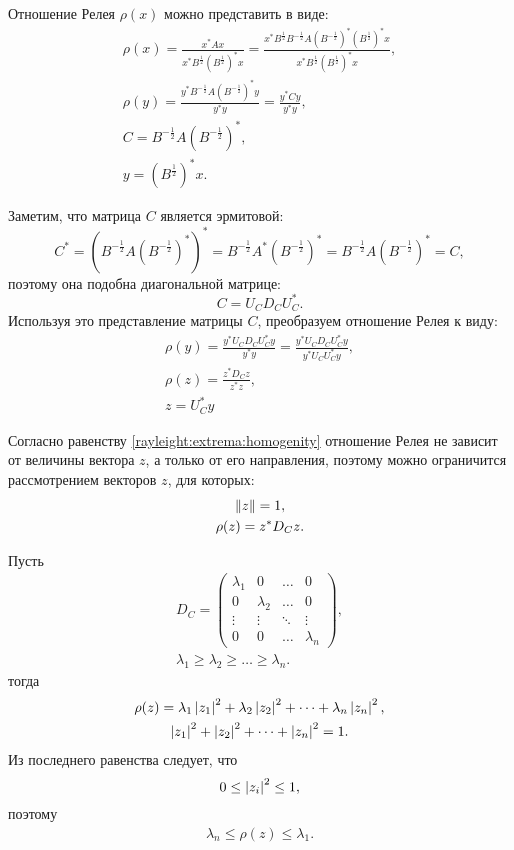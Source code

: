 Отношение Релея $\rho(x)$ можно представить в виде:
\begin{gather*}
    \rho(x)
    = \frac{x^* A x}{x^* B^\frac{1}{2} ( B^\frac{1}{2} )^* x}
    = \frac{x^* B^\frac{1}{2} B^{-\frac{1}{2}} A ( B^{-\frac{1}{2}} )^* ( B^\frac{1}{2} )^* x}{x^* B^\frac{1}{2} ( B^\frac{1}{2} )^* x} , \\
    \rho(y)
    = \frac{y^* B^{-\frac{1}{2}} A ( B^{-\frac{1}{2}} )^* y}{y^* y}
    = \frac{y^* C y}{y^* y}, \\
    C = B^{-\frac{1}{2}} A ( B^{-\frac{1}{2}} )^*, \\
    y = ( B^\frac{1}{2} )^* x .
\end{gather*}

Заметим, что матрица $C$ является эрмитовой:
\[
    C^*
    = ( B^{-\frac{1}{2}} A ( B^{-\frac{1}{2}} )^* )^*
    = B^{-\frac{1}{2}} A^* ( B^{-\frac{1}{2}} )^*
    = B^{-\frac{1}{2}} A ( B^{-\frac{1}{2}} )^*
    = C,
\]
поэтому она подобна диагональной матрице:
\[
    C = U_C D_C U_C^* .
\]
Используя это представление матрицы $C$, преобразуем отношение Релея к виду:
\begin{gather*}
    \rho(y)
    = \frac{y^* U_C D_C U_C^* y}{y^* y}
    = \frac{y^* U_C D_C U_C^* y}{y^* U_C U_C^* y} , \\
    \rho(z)
    = \frac{z^* D_C z}{z^* z} , \\
    z = U_C^* y
\end{gather*}

Согласно равенству \eqref{rayleight:extrema:homogenity} отношение Релея не зависит от величины вектора $z$, а только от его направления, поэтому можно ограничится рассмотрением
векторов $z$, для которых:
\begin{gather*}
    \left \| z \right \| = 1 , \\
    \rho(z) = z^* D_C z .
\end{gather*}

Пусть
\begin{gather*}
    D_C
    = \begin{pmatrix}
          \lambda_1 & 0         & \dots  & 0         \\
          0         & \lambda_2 & \dots  & 0         \\
          \vdots    & \vdots    & \ddots & \vdots    \\
          0         & 0         & \dots  & \lambda_n
    \end{pmatrix} , \\
    \lambda_1 \ge \lambda_2 \ge \dots \ge \lambda_n.
\end{gather*}
тогда
\begin{gather*}
    \rho(z)
    = \lambda_1 \left | z_1 \right |^2 + \lambda_2 \left | z_2 \right |^2 + \dots + \lambda_n \left | z_n \right |^2, \\
    \left | z_1 \right |^2 + \left | z_2 \right |^2 + \dots + \left | z_n \right |^2 = 1.
\end{gather*}
Из последнего равенства следует, что
\[
    0 \le \left | z_i \right |^2 \le 1 ,
\]
поэтому
\begin{gather*}
    \lambda_n \le \rho(z) \le \lambda_1 .
\end{gather*}

